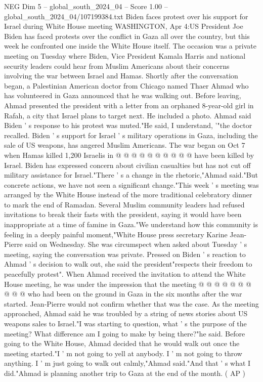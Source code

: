 \begin{textsample}{NEG Dim 5 – global\_south\_2024\_04 – Score 1.00 – global\_south\_2024\_04/107199384.txt}  \label{ex:f5_neg_189}
Biden faces protest over his support for Israel during White House meeting WASHINGTON, Apr 4:US President Joe Biden has faced protests over the conflict in Gaza all over the country, but this week he confronted one inside the White House itself.
The occasion was a private meeting on Tuesday where Biden, Vice President Kamala Harris and national security leaders could hear from Muslim Americans about their concerns involving the war between Israel and Hamas.
Shortly after the conversation began, a Palestinian American doctor from Chicago named Thaer Ahmad who has volunteered in Gaza announced that he was walking out.
Before leaving, Ahmad presented the president with a letter from an orphaned 8-year-old girl in Rafah, a city that Israel plans to target next.
He included a photo.
Ahmad said Biden ' s response to his protest was muted."He said, I understand, '"the doctor recalled.
Biden ' s support for Israel ' s military operations in Gaza, including the sale of US weapons, has angered Muslim Americans.
The war began on Oct 7 when Hamas killed 1,200 Israelis in @ @ @ @ @ @ @ @ @ @ have been killed by Israel.
Biden has expressed concern about civilian casualties but has not cut off military assistance for Israel."There ' s a change in the rhetoric,"Ahmad said."But concrete actions, we have not seen a significant change."This week ' s meeting was arranged by the White House instead of the more traditional celebratory dinner to mark the end of Ramadan.
Several Muslim community leaders had refused invitations to break their fasts with the president, saying it would have been inappropriate at a time of famine in Gaza."We understand how this community is feeling in a deeply painful moment,"White House press secretary Karine Jean-Pierre said on Wednesday.
She was circumspect when asked about Tuesday ' s meeting, saying the conversation was private.
Pressed on Biden ' s reaction to Ahmad ' s decision to walk out, she said the president"respects their freedom to peacefully protest".
When Ahmad received the invitation to attend the White House meeting, he was under the impression that the meeting @ @ @ @ @ @ @ @ @ @ who had been on the ground in Gaza in the six months after the war started.
Jean-Pierre would not confirm whether that was the case.
As the meeting approached, Ahmad said he was troubled by a string of news stories about US weapons sales to Israel."I was starting to question, what ' s the purpose of the meeting?
What difference am I going to make by being there?"he said.
Before going to the White House, Ahmad decided that he would walk out once the meeting started."I ' m not going to yell at anybody.
I ' m not going to throw anything.
I ' m just going to walk out calmly,"Ahmad said."And that ' s what I did."Ahmad is planning another trip to Gaza at the end of the month. ( AP )

\end{textsample}

